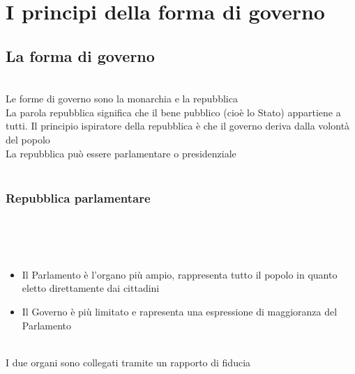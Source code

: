 \documentclass{report}
\begin{document}
\section{I principi della forma di governo}
\subsection{La forma di governo}
\\
Le forme di governo sono la monarchia e la repubblica
\\
La parola repubblica significa che il bene pubblico (cioè lo Stato) appartiene a tutti. Il principio ispiratore della repubblica è che il governo deriva dalla volontà del popolo
\\
La repubblica può essere parlamentare o presidenziale
\\
\\
\subsubsection{Repubblica parlamentare}
\\
\\
\\
\begin{itemize}
  \item{Il Parlamento è l'organo più ampio, rappresenta tutto il popolo in quanto eletto direttamente dai cittadini}
  \item{Il Governo è più limitato e rapresenta una espressione di maggioranza del Parlamento}
\end{itemize}
\\
I due organi sono collegati tramite un rapporto di fiducia
\\
\end{document}

